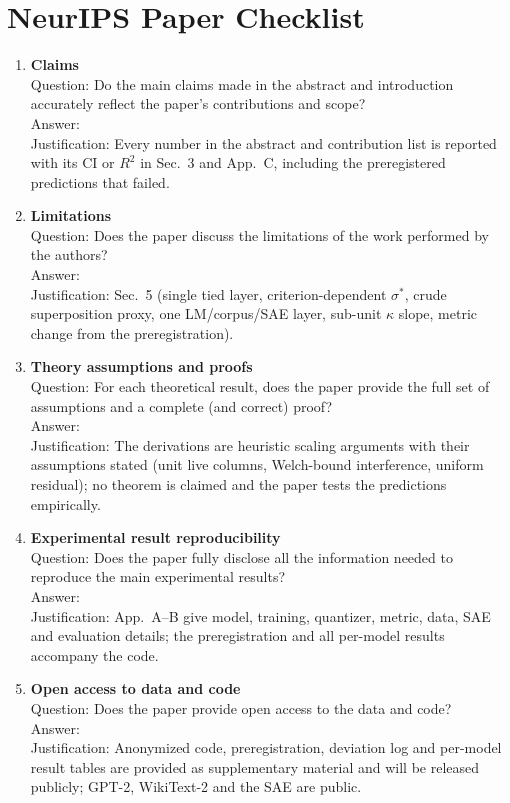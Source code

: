 \section*{NeurIPS Paper Checklist}
\begin{enumerate}
\item {\bf Claims} \\ Question: Do the main claims made in the abstract and introduction accurately reflect the paper's contributions and scope? \\ Answer: \answerYes{} \\ Justification: Every number in the abstract and contribution list is reported with its CI or $R^2$ in Sec.~3 and App.~C, including the preregistered predictions that failed.
\item {\bf Limitations} \\ Question: Does the paper discuss the limitations of the work performed by the authors? \\ Answer: \answerYes{} \\ Justification: Sec.~5 (single tied layer, criterion-dependent $\sigma^*$, crude superposition proxy, one LM/corpus/SAE layer, sub-unit $\kappa$ slope, metric change from the preregistration).
\item {\bf Theory assumptions and proofs} \\ Question: For each theoretical result, does the paper provide the full set of assumptions and a complete (and correct) proof? \\ Answer: \answerNA{} \\ Justification: The derivations are heuristic scaling arguments with their assumptions stated (unit live columns, Welch-bound interference, uniform residual); no theorem is claimed and the paper tests the predictions empirically.
\item {\bf Experimental result reproducibility} \\ Question: Does the paper fully disclose all the information needed to reproduce the main experimental results? \\ Answer: \answerYes{} \\ Justification: App.~A--B give model, training, quantizer, metric, data, SAE and evaluation details; the preregistration and all per-model results accompany the code.
\item {\bf Open access to data and code} \\ Question: Does the paper provide open access to the data and code? \\ Answer: \answerYes{} \\ Justification: Anonymized code, preregistration, deviation log and per-model result tables are provided as supplementary material and will be released publicly; GPT-2, WikiText-2 and the SAE are public.

\end{enumerate}
